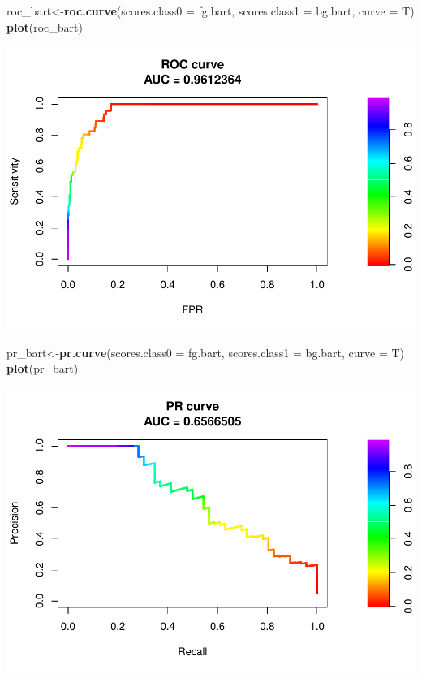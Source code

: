 \documentclass[]{article}
\newenvironment{Shaded}{\begin{snugshade}}{\end{snugshade}}
\newcommand{\DataTypeTok}[1]{\textcolor[rgb]{0.13,0.29,0.53}{#1}}
\newcommand{\KeywordTok}[1]{\textcolor[rgb]{0.13,0.29,0.53}{\textbf{#1}}}
\newcommand{\NormalTok}[1]{#1}
\begin{document}
\begin{Shaded}
\begin{Highlighting}[]
\NormalTok{roc_bart<-}\KeywordTok{roc.curve}\NormalTok{(}\DataTypeTok{scores.class0 =}\NormalTok{ fg.bart,}
                    \DataTypeTok{scores.class1 =}\NormalTok{ bg.bart,}
                    \DataTypeTok{curve =}\NormalTok{ T)}
\KeywordTok{plot}\NormalTok{(roc_bart)}
\end{Highlighting}
\end{Shaded}

\includegraphics{ml_analysis_lagged_with_imputation_files/figure-latex/unnamed-chunk-45-1.pdf}

\begin{Shaded}
\begin{Highlighting}[]
\NormalTok{pr_bart<-}\KeywordTok{pr.curve}\NormalTok{(}\DataTypeTok{scores.class0 =}\NormalTok{ fg.bart,}
                  \DataTypeTok{scores.class1 =}\NormalTok{ bg.bart,}
                  \DataTypeTok{curve =}\NormalTok{ T)}
\KeywordTok{plot}\NormalTok{(pr_bart)}
\end{Highlighting}
\end{Shaded}

\includegraphics{ml_analysis_lagged_with_imputation_files/figure-latex/unnamed-chunk-46-1.pdf}
\end{document}
